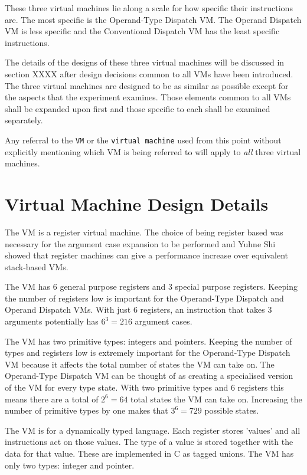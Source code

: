 \documentclass[english,a4paper]{report}
\begin{document}
These three virtual machines lie along a scale for how specific their 
instructions are. The most specific is the Operand-Type Dispatch VM. 
The Operand Dispatch VM is less specific and the Conventional 
Dispatch VM has the least specific instructions.

The details of the designs of these three virtual machines will be 
discussed in section XXXX after design decisions common to all VMs 
have been introduced. The three virtual machines are designed to be 
as similar as possible except for the aspects that the experiment 
examines. Those elements common to all VMs shall be expanded upon 
first and those specific to each shall be examined separately. 

Any referral to the \verb|VM| or the \verb|virtual machine| used from
this point without explicitly mentioning which VM is being referred to
will apply to \emph{all} three virtual machines.

\section{Virtual Machine Design Details}

The VM is a register virtual machine. The choice of being register
based was necessary for the argument case expansion to be performed
and Yuhne Shi\cite{Shi2007} showed that register machines can give a
performance increase over equivalent stack-based VMs.

The VM has 6 general purpose registers and 3 special purpose
registers. Keeping the number of registers low is important for the
Operand-Type Dispatch and Operand Dispatch VMs. With just 6 registers,
an instruction that takes 3 arguments potentially has $6^3 = 216$
argument cases.

The VM has two primitive types: integers and pointers. Keeping the
number of types and registers low is extremely important for the
Operand-Type Dispatch VM because it affects the total number of states
the VM can take on. The Operand-Type Dispatch VM can be thought of as
creating a specialised version of the VM for every type state. With
two primitive types and 6 registers this means there are a total of
$2^6 = 64$ total states the VM can take on. Increasing the number of
primitive types by one makes that $3^6 = 729$ possible states.

The VM is for a dynamically typed language. Each register
stores 'values' and all instructions act on those values. The type of
a value is stored together with the data for that value. These are
implemented in C as tagged unions. The VM has only two types: integer
and pointer.
\end{document}
